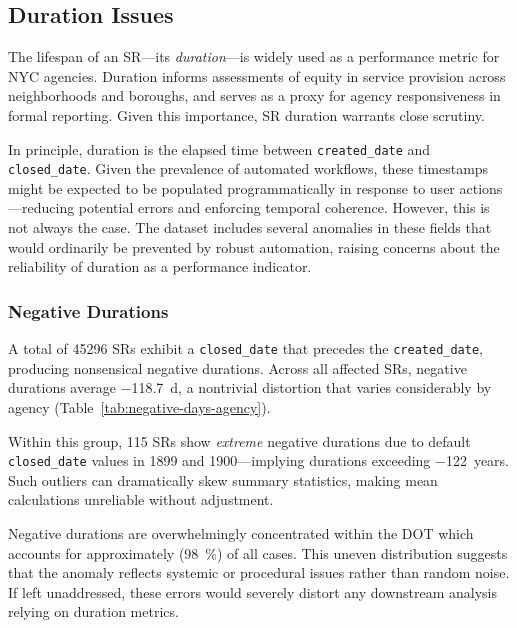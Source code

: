 \documentclass[linenumber]{jdsart}
\newcommand{\numint}[1]{\num[round-mode=none]{#1}}
\begin{document}
\subsection{Duration Issues}
\label{subsec:duration}
The lifespan of an SR—its \emph{duration}—is widely used as a performance
metric for NYC agencies. Duration informs assessments of equity in service
provision across neighborhoods and boroughs, and serves as a proxy for agency
responsiveness in formal reporting. Given this importance, SR duration
warrants close scrutiny.

In principle, duration is the elapsed time between
\texttt{created\_date} and \texttt{closed\_date}. Given the prevalence of
automated workflows, these timestamps might be expected to be populated
programmatically in response to user actions—reducing potential errors and
enforcing temporal coherence. However, this is not always the case. The
dataset includes several anomalies in these fields that would ordinarily be
prevented by robust automation, raising concerns about the reliability of
duration as a performance indicator.

\subsubsection{Negative Durations}
\label{subsubsec:negativedurations}
A total of \numint{45296} SRs exhibit a \texttt{closed\_date} that precedes the
\texttt{created\_date}, producing nonsensical negative durations. Across all
affected SRs, negative durations average \SI[round-precision=1]{-118.7}{\day}, a nontrivial distortion
that varies considerably by agency (Table~\ref{tab:negative-days-agency}).

Within this group, \numint{115} SRs show \emph{extreme} negative durations due to default
\texttt{closed\_date} values in 1899 and 1900—implying durations exceeding
\num{-122}~years. Such outliers can dramatically skew summary statistics,
making mean calculations unreliable without adjustment.

Negative durations are overwhelmingly concentrated within the
DOT which accounts for approximately (\SI[round-precision=0]{98}{\percent}) 
of all cases. This uneven distribution suggests that the
anomaly reflects systemic or procedural issues rather than random noise. If
left unaddressed, these errors would severely distort any downstream analysis
relying on duration metrics.
\end{document}
